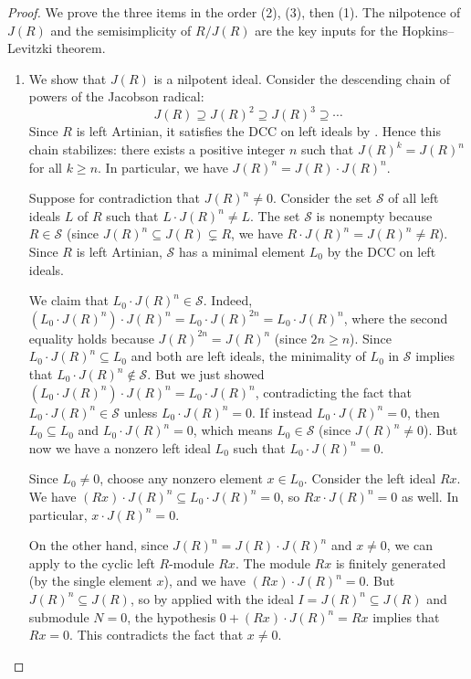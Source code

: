 \begin{proof}

    We prove the three items in the order (2), (3), then (1). The nilpotence of $J(R)$ and the semisimplicity of $R/J(R)$ are the key inputs for the Hopkins--Levitzki theorem.

    \begin{enumerate}
        \item We show that $J(R)$ is a nilpotent ideal. Consider the descending chain of powers of the Jacobson radical:
        $$J(R) \supseteq J(R)^2 \supseteq J(R)^3 \supseteq \cdots$$
        Since $R$ is left Artinian, it satisfies the DCC on left ideals by . Hence this chain stabilizes: there exists a positive integer $n$ such that $J(R)^k = J(R)^n$ for all $k \geq n$. In particular, we have $J(R)^n = J(R) \cdot J(R)^n$.

        Suppose for contradiction that $J(R)^n \neq 0$. Consider the set $\mathcal{S}$ of all left ideals $L$ of $R$ such that $L \cdot J(R)^n \neq L$. The set $\mathcal{S}$ is nonempty because $R \in \mathcal{S}$ (since $J(R)^n \subseteq J(R) \subsetneq R$, we have $R \cdot J(R)^n = J(R)^n \neq R$). Since $R$ is left Artinian, $\mathcal{S}$ has a minimal element $L_0$ by the DCC on left ideals.

        We claim that $L_0 \cdot J(R)^n \in \mathcal{S}$. Indeed, $(L_0 \cdot J(R)^n) \cdot J(R)^n = L_0 \cdot J(R)^{2n} = L_0 \cdot J(R)^n$, where the second equality holds because $J(R)^{2n} = J(R)^n$ (since $2n \geq n$). Since $L_0 \cdot J(R)^n \subseteq L_0$ and both are left ideals, the minimality of $L_0$ in $\mathcal{S}$ implies that $L_0 \cdot J(R)^n \notin \mathcal{S}$. But we just showed $(L_0 \cdot J(R)^n) \cdot J(R)^n = L_0 \cdot J(R)^n$, contradicting the fact that $L_0 \cdot J(R)^n \in \mathcal{S}$ unless $L_0 \cdot J(R)^n = 0$. If instead $L_0 \cdot J(R)^n = 0$, then $L_0 \subseteq L_0$ and $L_0 \cdot J(R)^n = 0$, which means $L_0 \in \mathcal{S}$ (since $J(R)^n \neq 0$). But now we have a nonzero left ideal $L_0$ such that $L_0 \cdot J(R)^n = 0$.

        Since $L_0 \neq 0$, choose any nonzero element $x \in L_0$. Consider the left ideal $Rx$. We have $(Rx) \cdot J(R)^n \subseteq L_0 \cdot J(R)^n = 0$, so $R x \cdot J(R)^n = 0$ as well. In particular, $x \cdot J(R)^n = 0$.

        On the other hand, since $J(R)^n = J(R) \cdot J(R)^n$ and $x \neq 0$, we can apply  to the cyclic left $R$-module $Rx$. The module $Rx$ is finitely generated (by the single element $x$), and we have $(Rx) \cdot J(R)^n = 0$. But $J(R)^n \subseteq J(R)$, so by  applied with the ideal $I = J(R)^n \subseteq J(R)$ and submodule $N = 0$, the hypothesis $0 + (Rx) \cdot J(R)^n = Rx$ implies that $Rx = 0$. This contradicts the fact that $x \neq 0$.


\end{enumerate}
\end{proof}
